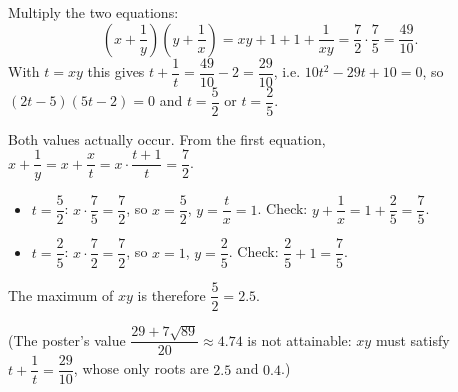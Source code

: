 Multiply the two equations:
\[
\left(x+\dfrac{1}{y}\right)\left(y+\dfrac{1}{x}\right)=xy+1+1+\dfrac{1}{xy}=\dfrac{7}{2}\cdot\dfrac{7}{5}=\dfrac{49}{10}.
\]
With $t=xy$ this gives $t+\dfrac{1}{t}=\dfrac{49}{10}-2=\dfrac{29}{10}$, i.e. $10t^2-29t+10=0$, so $(2t-5)(5t-2)=0$ and $t=\dfrac{5}{2}$ or $t=\dfrac{2}{5}$.

Both values actually occur. From the first equation, $x+\dfrac{1}{y}=x+\dfrac{x}{t}=x\cdot\dfrac{t+1}{t}=\dfrac{7}{2}$.
\begin{itemize}
\item $t=\dfrac{5}{2}$: $x\cdot\dfrac{7}{5}=\dfrac{7}{2}$, so $x=\dfrac{5}{2}$, $y=\dfrac {t}{x}=1$. Check: $y+\dfrac{1}{x}=1+\dfrac{2}{5}=\dfrac{7}{5}$.
\item $t=\dfrac{2}{5}$: $x\cdot\dfrac{7}{2}=\dfrac{7}{2}$, so $x=1$, $y=\dfrac{2}{5}$. Check: $\dfrac{2}{5}+1=\dfrac{7}{5}$.
\end{itemize}
The maximum of $xy$ is therefore $\dfrac{5}{2}=\boxed{2.5}$.

(The poster's value $\dfrac{29+7\sqrt{89}}{20}\approx4.74$ is not attainable: $xy$ must satisfy $t+\dfrac{1}{t}=\dfrac{29}{10}$, whose only roots are $2.5$ and $0.4$.)
